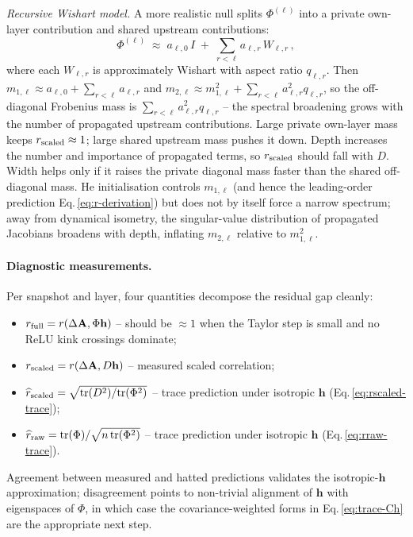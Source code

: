 \documentclass[10pt]{article}
\newcommand{\vA}{\mathbf{A}}
\newcommand{\vh}{\mathbf{h}}
\begin{document}
\emph{Recursive Wishart model.}  A more realistic null splits $\Phi^{(\ell)}$ into a private own-layer contribution and shared upstream contributions:
\[
  \Phi^{(\ell)} \;\approx\; a_{\ell,0}\,I \;+\; \sum_{r<\ell} a_{\ell,r}\,W_{\ell,r}\,,
\]
where each $W_{\ell,r}$ is approximately Wishart with aspect ratio $q_{\ell,r}$.  Then $m_{1,\ell}\approx a_{\ell,0}+\sum_{r<\ell}a_{\ell,r}$ and $m_{2,\ell}\approx m_{1,\ell}^2+\sum_{r<\ell}a_{\ell,r}^2 q_{\ell,r}$, so the off-diagonal Frobenius mass is $\sum_{r<\ell}a_{\ell,r}^2 q_{\ell,r}$ -- the spectral broadening grows with the number of propagated upstream contributions.  Large private own-layer mass keeps $r_{\rm scaled}\approx 1$; large shared upstream mass pushes it down.  Depth increases the number and importance of propagated terms, so $r_{\rm scaled}$ should fall with $D$.  Width helps only if it raises the private diagonal mass faster than the shared off-diagonal mass.  He initialisation controls $m_{1,\ell}$ (and hence the leading-order prediction Eq.\,\ref{eq:r-derivation}) but does not by itself force a narrow spectrum; away from dynamical isometry, the singular-value distribution of propagated Jacobians broadens with depth, inflating $m_{2,\ell}$ relative to $m_{1,\ell}^2$.

\paragraph{Diagnostic measurements.}
Per snapshot and layer, four quantities decompose the residual gap cleanly:
\begin{itemize}
  \setlength\itemsep{0pt}
  \item $r_{\rm full} = r(\Delta\vA,\Phi\vh)$ -- should be $\approx 1$ when the Taylor step is small and no ReLU kink crossings dominate;
  \item $r_{\rm scaled} = r(\Delta\vA, D\vh)$ -- measured scaled correlation;
  \item $\widehat r_{\rm scaled} = \sqrt{\mathrm{tr}(D^2)/\mathrm{tr}(\Phi^2)}$ -- trace prediction under isotropic $\vh$ (Eq.\,\ref{eq:rscaled-trace});
  \item $\widehat r_{\rm raw} = \mathrm{tr}(\Phi)/\sqrt{n\,\mathrm{tr}(\Phi^2)}$ -- trace prediction under isotropic $\vh$ (Eq.\,\ref{eq:rraw-trace}).
\end{itemize}
Agreement between measured and hatted predictions validates the isotropic-$\vh$ approximation; disagreement points to non-trivial alignment of $\vh$ with eigenspaces of $\Phi$, in which case the covariance-weighted forms in Eq.\,\ref{eq:trace-Ch} are the appropriate next step.
\end{document}
